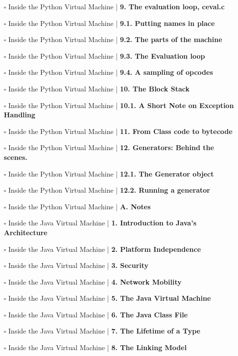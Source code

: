 \documentclass[a4, landscape, 12pt]{article}
\newcommand{\checkbox}{$\square$}%
\begin{document}
\begin{itemize}
{}
\item [\checkbox]  Inside the Python Virtual Machine  | \textbf{ 9. The evaluation loop, ceval.c
}
\item [\checkbox]  Inside the Python Virtual Machine  | \textbf{ 9.1. Putting names in place
}
\item [\checkbox]  Inside the Python Virtual Machine  | \textbf{ 9.2. The parts of the machine
}
\item [\checkbox]  Inside the Python Virtual Machine  | \textbf{ 9.3. The Evaluation loop
}
\item [\checkbox]  Inside the Python Virtual Machine  | \textbf{ 9.4. A sampling of opcodes
}
\item [\checkbox]  Inside the Python Virtual Machine  | \textbf{ 10. The Block Stack
}
\item [\checkbox]  Inside the Python Virtual Machine  | \textbf{ 10.1. A Short Note on Exception Handling
}
\item [\checkbox]  Inside the Python Virtual Machine  | \textbf{ 11. From Class code to bytecode
}
\item [\checkbox]  Inside the Python Virtual Machine  | \textbf{ 12. Generators: Behind the scenes.
}
\item [\checkbox]  Inside the Python Virtual Machine  | \textbf{ 12.1. The Generator object
}
\item [\checkbox]  Inside the Python Virtual Machine  | \textbf{ 12.2. Running a generator
}
\item [\checkbox]  Inside the Python Virtual Machine  | \textbf{ A. Notes
}
\item [\checkbox]  Inside the Java Virtual Machine | \textbf{ 1. Introduction to Java's Architecture
}
\item [\checkbox]  Inside the Java Virtual Machine | \textbf{ 2. Platform Independence
}
\item [\checkbox]  Inside the Java Virtual Machine | \textbf{ 3. Security
}
\item [\checkbox]  Inside the Java Virtual Machine | \textbf{ 4. Network Mobility
}
\item [\checkbox]  Inside the Java Virtual Machine | \textbf{ 5. The Java Virtual Machine
}
\item [\checkbox]  Inside the Java Virtual Machine | \textbf{ 6. The Java Class File
}
\item [\checkbox]  Inside the Java Virtual Machine | \textbf{ 7. The Lifetime of a Type
}
\item [\checkbox]  Inside the Java Virtual Machine | \textbf{ 8. The Linking Model
}
\end{itemize}
\end{document}
